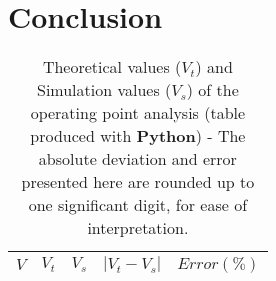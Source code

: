 \section{Conclusion}
\label{sec:conclusion}


\begin{table}[H]
  \centering
  \begin{tabular}{|c|c|c|c|c|}
    \hline
        $V$ & $V_t$ & $V_s$ & $|V_t-V_s|$ & $Error (\%)$ \\
        \hline
        \hline
        
        \hline
  \end{tabular}
  \caption{Theoretical values ($V_t$) and Simulation values ($V_s$) of the operating point analysis (table produced with {\bf Python})  - The absolute deviation and error presented here are rounded up to one significant digit, for ease of interpretation.}
  \label{error1_res}
\end{table}
